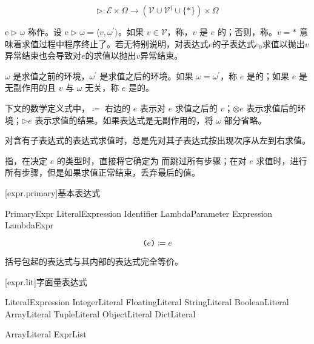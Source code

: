 $$ \mathrm{\rhd}: \mathcal{E} \times \Omega \rightarrow (\mathcal{V} \cup \mathcal{V}^\dag \cup \{\ast\}) \times \Omega $$

\pnum
$\mathrm{e \rhd \omega}$ 称作。设 $\mathrm{e \rhd \omega} = \langle v, \omega^\prime \rangle$。如果 $v \in \mathcal{V}$，称，$v$ 是 $e$ 的；否则，称。$v = \ast$ 意味着求值过程中程序终止了。若无特别说明，对表达式$e$的子表达式$e_0$求值以抛出$v$异常结束也会导致对$e$的求值以抛出$v$异常结束。

\pnum
$\omega$ 是求值之前的环境，$\omega^\prime$ 是求值之后的环境。如果 $\omega = \omega^\prime$，称 $e$ 是的；如果 $e$ 是无副作用的且 $v$ 与 $\omega$ 无关，称 $e$ 是的。

\pnum
下文的数学定义式中，$\coloneqq$ 右边的 $e$ 表示对 $e$ 求值之后的 $v$；$\otimes e$ 表示求值后的环境；$\rhd e$ 表示求值的结果。如果表达式是无副作用的，将 $\omega$ 部分省略。

\pnum
对含有子表达式的表达式求值时，总是先对其子表达式按出现次序从左到右求值。

\pnum
{}指，在决定 $e$ 的类型时，直接将它确定为  而跳过所有步骤；在对 $e$ 求值时，进行所有步骤，但是如果求值正常结束，丢弃最后的值。

[expr.primary]{基本表达式}

\begin{bnf}{PrimaryExpr}
    LiteralExpression \br
    Identifier \br
    LambdaParameter \br
    \terminal{(} Expression \terminal{)} \br
    LambdaExpr
\end{bnf}

$$ \texttt{(}e\texttt{)} \coloneqq e $$

\pnum
括号包起的表达式与其内部的表达式完全等价。

[expr.lit]{字面量表达式}

\begin{bnf}{LiteralExpression}
    IntegerLiteral \br
    FloatingLiteral \br
    StringLiteral \br
    BooleanLiteral \br
     \br
    ArrayLiteral \br
    TupleLiteral \br
    ObjectLiteral \br
    DictLiteral
\end{bnf}

\begin{bnf}{ArrayLiteral}
    \terminal{[} ExprList\bnfq \terminal{]}
\end{bnf}

